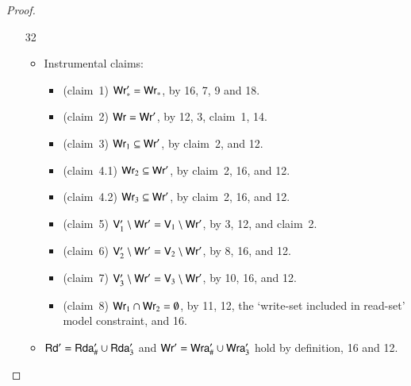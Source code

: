 \begin{proof}
\begin{itemize}
\begin{itemize}
  \item[32]
    \begin{itemize}
    \item Instrumental claims:
      \begin{itemize}
  \item(claim~1) $\mathsf{Wr}'_* = \mathsf{Wr}_*$, by 16, 7, 9 and 18.
  \item(claim~2) $\mathsf{Wr} = \mathsf{Wr}'$, by 12, 3, claim~1, 14.
  \item(claim~3) $\mathsf{Wr}_1 \subseteq \mathsf{Wr}'$, by claim~2, and 12.
  \item(claim~4.1) $\mathsf{Wr}_2 \subseteq \mathsf{Wr}'$, by claim~2, 16, and 12.
  \item(claim~4.2) $\mathsf{Wr}_3 \subseteq \mathsf{Wr}'$, by claim~2, 16, and 12.    
  \item(claim~5) $\mathsf{V}'_1 \setminus \mathsf{Wr}' = \mathsf{V}_1 \setminus \mathsf{Wr}'$, by 3, 12, and claim~2.
  \item(claim~6) $\mathsf{V}'_2 \setminus \mathsf{Wr}' = \mathsf{V}_2 \setminus \mathsf{Wr}'$, by 8, 16, and 12.
  \item(claim~7) $\mathsf{V}'_3 \setminus \mathsf{Wr}' = \mathsf{V}_3 \setminus \mathsf{Wr}'$, by 10, 16, and 12.
  \item(claim~8) $\mathsf{Wr}_1 \cap \mathsf{Wr}_2 = \emptyset$, by 11, 12, the `write-set included in read-set' model constraint, and 16.
      \end{itemize}
    \item $\mathsf{Rd}' = \mathsf {Rda}'_\# \cup \mathsf {Rda}'_3$ and $\mathsf{Wr}' = \mathsf {Wra}'_\# \cup \mathsf {Wra}'_3$ hold by definition, 16 and 12. 


\end{itemize}
\end{itemize}
\end{itemize}
\end{proof}
